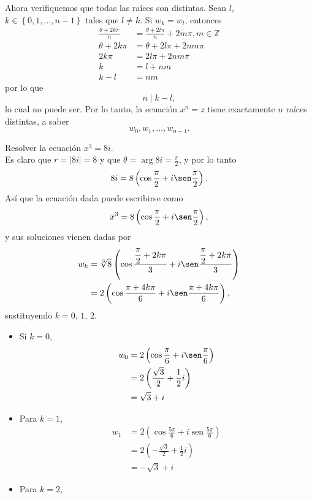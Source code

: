 Ahora verifiquemos que todas las raíces son distintas. Sean $l$, $k \in \left\{ 0,  1,  \dots,  n-1 \right\}$ tales que $l \neq k$. Si $w_k=w_l$, entonces
\begin{align*}
    \frac{\theta +2k\pi}{n} &= \frac{\theta +2l\pi}{n}+2m\pi,  m \in \mathbb{Z} \\
    \theta +2k\pi &= \theta +2l\pi +2nm\pi \\
    2k\pi &=2l\pi +2nm\pi \\
    k &=l+nm \\
    k-l &=nm
\end{align*}
por lo que
$$n \mid k-l,$$
lo cual no puede ser. Por lo tanto, la ecuación $x^n=z$ tiene exactamente $n$ raíces distintas, a saber
$$w_0,  w_1,  \dots,  w_{n-1}.$$

\begin{example}
    Resolver la ecuación $x^3=8 i$. \\
    \solucion Es claro que $r=|8 i|=8$ y que $\displaystyle  \theta=\arg 8 i=\frac{\pi}{2}$, y por lo tanto
    $$ 8 i=8\left(\cos \frac{\pi}{2}+i \sen \frac{\pi}{2}\right).$$
    Así que la ecuación dada puede escribirse como
    $$x^3=8\left(\cos \frac{\pi}{2}+i \sen \frac{\pi}{2}\right),$$
    y sus soluciones vienen dadas por
    \begin{align*}
        w_k &=\sqrt[3]{8}\left(\cos \frac{\displaystyle\frac{\pi}{2}+2 k \pi}{3}+i \sen \frac{\displaystyle\frac{\pi}{2}+2 k \pi}{3}\right) \\
        &= 2 \left(\cos \frac{\pi +4k\pi}{6}+i \sen \frac{\pi +4k\pi}{6} \right),
    \end{align*}
    sustituyendo $k=0, \, 1, \,2$.
    \begin{itemize}
        \item Si $k=0$,
        $$ \begin{aligned} w_0 &=2\left(\cos \frac{\pi}{6}+i \sen \frac{\pi}{6}\right) \\ &=2\left(\frac{\sqrt{3}}{2}+\frac{1}{2} i\right) \\ &=\sqrt{3}+i \end{aligned} $$ 
        \item Para $k=1$,
        $$ \begin{aligned} w_1 &=2\left(\cos \frac{5 \pi}{6}+i \operatorname{sen} \frac{5 \pi}{6}\right) \\ &=2\left(-\frac{\sqrt{3}}{2}+\frac{1}{2} i\right) \\ &=-\sqrt{3}+i \end{aligned} $$
        \item Para $k=2$,

\end{itemize}
\end{example}
